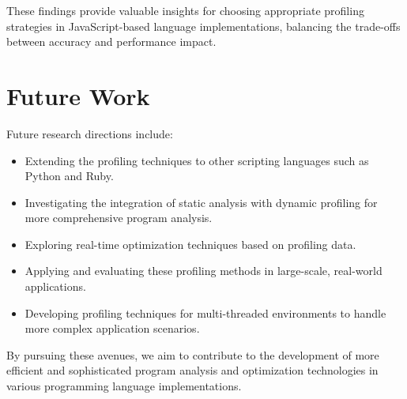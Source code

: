 \documentclass[a4paper,10pt]{article}
\begin{document}
These findings provide valuable insights for choosing appropriate profiling strategies in JavaScript-based language implementations, balancing the trade-offs between accuracy and performance impact.

\section*{Future Work}
Future research directions include:
\begin{itemize}
    \item Extending the profiling techniques to other scripting languages such as Python and Ruby.
    \item Investigating the integration of static analysis with dynamic profiling for more comprehensive program analysis.
    \item Exploring real-time optimization techniques based on profiling data.
    \item Applying and evaluating these profiling methods in large-scale, real-world applications.
    \item Developing profiling techniques for multi-threaded environments to handle more complex application scenarios.
\end{itemize}

By pursuing these avenues, we aim to contribute to the development of more efficient and sophisticated program analysis and optimization technologies in various programming language implementations.
\end{document}
